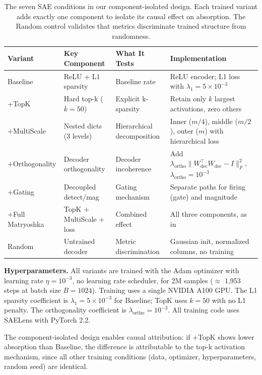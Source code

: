 \documentclass{article}
\begin{document}
\begin{table}[t]
\caption{The seven SAE conditions in our component-isolated design. Each trained variant adds exactly one component to isolate its causal effect on absorption. The Random control validates that metrics discriminate trained structure from randomness.}
\label{tab:variants}
\centering
\footnotesize
\begin{tabular}{lp{1.8cm}p{2.2cm}p{4.5cm}}
\toprule
Variant & Key Component & What It Tests & Implementation \\
\midrule
Baseline & ReLU + L1 sparsity & Baseline rate & ReLU encoder; L1 loss with $\lambda_1 = 5\times10^{-3}$ \\
+TopK & Hard top-k ($k=50$) & Explicit k-sparsity & Retain only $k$ largest activations, zero others \\
+MultiScale & Nested dicts (3 levels) & Hierarchical decomposition & Inner ($m/4$), middle ($m/2$), outer ($m$) with hierarchical loss \\
+Orthogonality & Decoder orthogonality & Decoder incoherence & Add $\lambda_{\text{ortho}}\|W_{\text{dec}}^\top W_{\text{dec}} - I\|_F^2$, $\lambda_{\text{ortho}}=10^{-3}$ \\
+Gating & Decoupled detect/mag & Gating mechanism & Separate paths for firing (gate) and magnitude \\
+Full Matryoshka & TopK + MultiScale + loss & Combined effect & All three components, as in \citet{bussmann2025matryoshka} \\
Random & Untrained decoder & Metric discrimination & Gaussian init, normalized columns, no training \\
\bottomrule
\end{tabular}
\end{table}

\textbf{Hyperparameters.} All variants are trained with the Adam optimizer \citep{kingma2015adam} with learning rate $\eta = 10^{-3}$, no learning rate scheduler, for 2M samples ($\approx$ 1,953 steps at batch size $B = 1024$). Training uses a single NVIDIA A100 GPU. The L1 sparsity coefficient is $\lambda_1 = 5 \times 10^{-3}$ for Baseline; TopK uses $k = 50$ with no L1 penalty. The orthogonality coefficient is $\lambda_{\text{ortho}} = 10^{-3}$. All training code uses SAELens \citep{lieberum2024automated} with PyTorch 2.2.

The component-isolated design enables causal attribution: if +TopK shows lower absorption than Baseline, the difference is attributable to the top-k activation mechanism, since all other training conditions (data, optimizer, hyperparameters, random seed) are identical.
\end{document}
